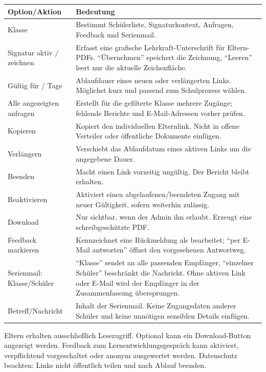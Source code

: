 \documentclass[12pt,a4paper]{article}
\begin{document}
\small
\begin{longtable}{|p{}|p{}|}
\hline
\textbf{Option/Aktion} & \textbf{Bedeutung}\\
\hline
Klasse & Bestimmt Schülerliste, Signaturkontext, Anfragen, Feedback und Serienmail.\\
\hline
Signatur aktiv / zeichnen & Erfasst eine grafische Lehrkraft-Unterschrift für Eltern-PDFs. \enquote{Übernehmen} speichert die Zeichnung, \enquote{Leeren} leert nur die aktuelle Zeichenfläche.\\
\hline
Gültig für / Tage & Ablaufdauer eines neuen oder verlängerten Links. Möglichst kurz und passend zum Schulprozess wählen.\\
\hline
Alle angezeigten anfragen & Erstellt für die gefilterte Klasse mehrere Zugänge; fehlende Berichte und E-Mail-Adressen vorher prüfen.\\
\hline
Kopieren & Kopiert den individuellen Elternlink. Nicht in offene Verteiler oder öffentliche Dokumente einfügen.\\
\hline
Verlängern & Verschiebt das Ablaufdatum eines aktiven Links um die angegebene Dauer.\\
\hline
Beenden & Macht einen Link vorzeitig ungültig. Der Bericht bleibt erhalten.\\
\hline
Reaktivieren & Aktiviert einen abgelaufenen/beendeten Zugang mit neuer Gültigkeit, sofern weiterhin zulässig.\\
\hline
Download & Nur sichtbar, wenn der Admin ihn erlaubt. Erzeugt eine schreibgeschützte PDF.\\
\hline
Feedback markieren & Kennzeichnet eine Rückmeldung als bearbeitet; \enquote{per E-Mail antworten} öffnet den vorgesehenen Antwortweg.\\
\hline
Serienmail: Klasse/Schüler & \enquote{Klasse} sendet an alle passenden Empfänger, \enquote{einzelner Schüler} beschränkt die Nachricht. Ohne aktiven Link oder E-Mail wird der Empfänger in der Zusammenfassung übersprungen.\\
\hline
Betreff/Nachricht & Inhalt der Serienmail. Keine Zugangsdaten anderer Schüler und keine unnötigen sensiblen Details einfügen.\\
\hline
\end{longtable}
\normalsize

Eltern erhalten ausschließlich Lesezugriff. Optional kann ein Download-Button angezeigt werden. Feedback zum Lernentwicklungsgespräch kann aktiviert, verpflichtend vorgeschaltet oder anonym ausgewertet werden. Datenschutz beachten: Links nicht öffentlich teilen und nach Ablauf beenden.
\end{document}
